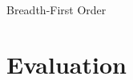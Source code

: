 \documentclass[aspectratio=169,notes]{beamer}
\begin{document}
\begin{frame}{Breadth-First Order}

\begin{figure}
    \centering %
\end{figure}


\end{frame}


\section{Evaluation}
\end{document}

